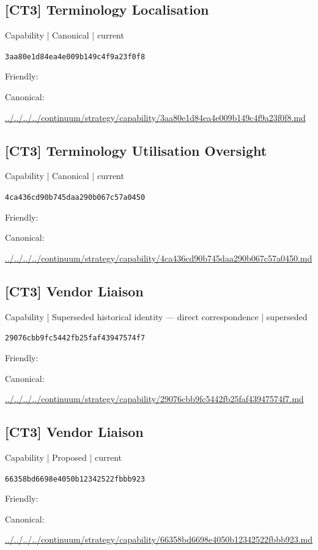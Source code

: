 \documentclass[10pt,a4paper]{article}
\begin{document}
\subsection*{[CT3] Terminology Localisation}
{\small Capability | Canonical | current}\par
\texttt{3aa80e1d84ea4e009b149c4f9a23f0f8}\par
Friendly: \par
Canonical: \par
{\footnotesize\url{../../../../continuum/strategy/capability/3aa80e1d84ea4e009b149c4f9a23f0f8.md}}\par
\subsection*{[CT3] Terminology Utilisation Oversight}
{\small Capability | Canonical | current}\par
\texttt{4ca436cd90b745daa290b067c57a0450}\par
Friendly: \par
Canonical: \par
{\footnotesize\url{../../../../continuum/strategy/capability/4ca436cd90b745daa290b067c57a0450.md}}\par
\subsection*{[CT3] Vendor Liaison}
{\small Capability | Superseded historical identity — direct correspondence | superseded}\par
\texttt{29076cbb9fc5442fb25faf43947574f7}\par
Friendly: \par
Canonical: \par
{\footnotesize\url{../../../../continuum/strategy/capability/29076cbb9fc5442fb25faf43947574f7.md}}\par
\subsection*{[CT3] Vendor Liaison}
{\small Capability | Proposed | current}\par
\texttt{66358bd6698e4050b12342522fbbb923}\par
Friendly: \par
Canonical: \par
{\footnotesize\url{../../../../continuum/strategy/capability/66358bd6698e4050b12342522fbbb923.md}}\par
\end{document}

